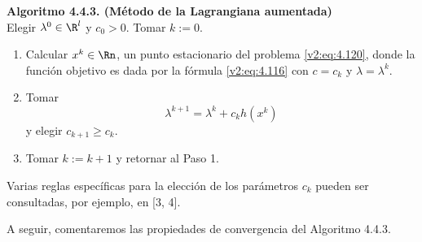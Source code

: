 \vspace{0.3cm}
\noindent\textbf{Algoritmo 4.4.3. (Método de la Lagrangiana aumentada)}\\
Elegir $\lambda^0 \in \R^l$ y $c_0 > 0$. Tomar $k:=0$.
\begin{enumerate}
    \item Calcular $x^k \in \Rn$, un punto estacionario del problema \eqref{v2:eq:4.120}, donde la función objetivo es dada por la fórmula \eqref{v2:eq:4.116} con $c = c_k$ y $\lambda = \lambda^k$.
    \item Tomar
    \[
        \lambda^{k+1} = \lambda^k + c_k h(x^k)
    \]
    y elegir $c_{k+1} \ge c_k$.
    \item Tomar $k := k+1$ y retornar al Paso 1.
\end{enumerate}
\vspace{0.3cm}

Varias reglas específicas para la elección de los parámetros $c_k$ pueden ser consultadas, por ejemplo, en [3, 4].

A seguir, comentaremos las propiedades de convergencia del Algoritmo 4.4.3.

